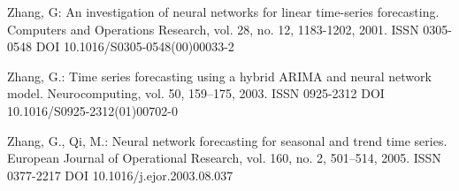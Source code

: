 \begin{thebibliography}{99.}
 Zhang, G: An investigation of neural networks for linear time-series forecasting. Computers and Operations Research, vol. 28, no. 12, 1183-1202, 2001. ISSN 0305-0548 DOI 10.1016/S0305-0548(00)00033-2

 Zhang, G.: Time series forecasting using a hybrid ARIMA and neural network model. Neurocomputing, vol. 50, 159--175, 2003. ISSN 0925-2312 DOI 10.1016/S0925-2312(01)00702-0

 Zhang, G., Qi, M.: Neural network forecasting for seasonal and trend time series. European Journal of Operational Research, vol. 160, no. 2, 501--514, 2005. ISSN 0377-2217 DOI 10.1016/j.ejor.2003.08.037

\end{thebibliography}
